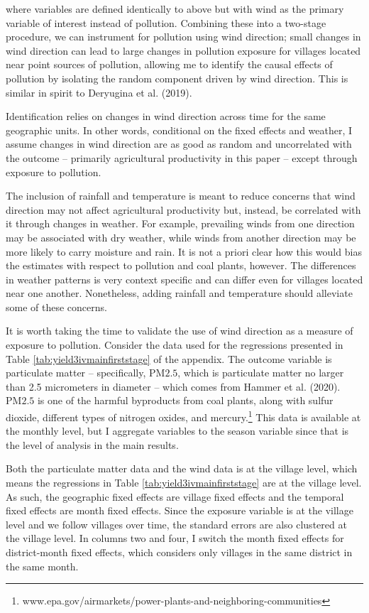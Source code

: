 \documentclass[
]{article}
\begin{document}
where variables are defined identically to above but with wind as the primary variable of interest instead of pollution. Combining these into a two-stage procedure, we can instrument for pollution using wind direction; small changes in wind direction can lead to large changes in pollution exposure for villages located near point sources of pollution, allowing me to identify the causal effects of pollution by isolating the random component driven by wind direction. This is similar in spirit to Deryugina et al. (2019).

Identification relies on changes in wind direction across time for the same geographic units. In other words, conditional on the fixed effects and weather, I assume changes in wind direction are as good as random and uncorrelated with the outcome -- primarily agricultural productivity in this paper -- except through exposure to pollution.

The inclusion of rainfall and temperature is meant to reduce concerns that wind direction may not affect agricultural productivity but, instead, be correlated with it through changes in weather. For example, prevailing winds from one direction may be associated with dry weather, while winds from another direction may be more likely to carry moisture and rain. It is not a priori clear how this would bias the estimates with respect to pollution and coal plants, however. The differences in weather patterns is very context specific and can differ even for villages located near one another. Nonetheless, adding rainfall and temperature should alleviate some of these concerns.

It is worth taking the time to validate the use of wind direction as a measure of exposure to pollution. Consider the data used for the regressions presented in Table \ref{tab:yield3ivmainfirststage} of the appendix. The outcome variable is particulate matter -- specifically, \(\mathrm{PM 2.5}\), which is particulate matter no larger than 2.5 micrometers in diameter -- which comes from Hammer et al. (2020). \(\mathrm{PM 2.5}\) is one of the harmful byproducts from coal plants, along with sulfur dioxide, different types of nitrogen oxides, and mercury.\footnote{www.epa.gov/airmarkets/power-plants-and-neighboring-communities} This data is available at the monthly level, but I aggregate variables to the season variable since that is the level of analysis in the main results.

Both the particulate matter data and the wind data is at the village level, which means the regressions in Table \ref{tab:yield3ivmainfirststage} are at the village level. As such, the geographic fixed effects are village fixed effects and the temporal fixed effects are month fixed effects. Since the exposure variable is at the village level and we follow villages over time, the standard errors are also clustered at the village level. In columns two and four, I switch the month fixed effects for district-month fixed effects, which considers only villages in the same district in the same month.
\end{document}
